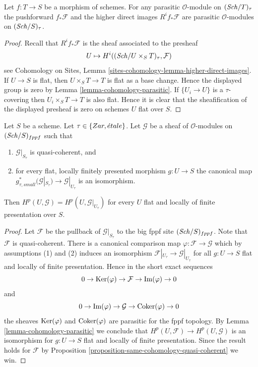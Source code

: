 \begin{lemma}
\label{lemma-direct-image-parasitic}
Let $f : T \to S$ be a morphism of schemes. For any parasitic
$\mathcal{O}$-module on $(\mathit{Sch}/T)_\tau$ the pushforward
$f_*\mathcal{F}$ and the higher direct images $R^if_*\mathcal{F}$
are parasitic $\mathcal{O}$-modules on $(\mathit{Sch}/S)_\tau$.
\end{lemma}

\begin{proof}
Recall that $R^if_*\mathcal{F}$ is the sheaf associated to the
presheaf
$$
U \mapsto H^i((\mathit{Sch}/U \times_S T)_\tau, \mathcal{F})
$$
see
Cohomology on Sites, Lemma \ref{sites-cohomology-lemma-higher-direct-images}.
If $U \to S$ is flat, then $U \times_S T \to T$ is flat as a base change.
Hence the displayed group is zero by
Lemma \ref{lemma-cohomology-parasitic}.
If $\{U_i \to U\}$ is a $\tau$-covering then
$U_i \times_S T \to T$ is also flat.
Hence it is clear that the sheafification of the displayed
presheaf is zero on schemes $U$ flat over $S$.
\end{proof}

\begin{lemma}
\label{lemma-quasi-coherent-and-flat-base-change}
Let $S$ be a scheme. Let $\tau \in \{Zar, {\acute{e}tale}\}$.
Let $\mathcal{G}$ be a sheaf of $\mathcal{O}$-modules on
$(\mathit{Sch}/S)_{fppf}$ such that
\begin{enumerate}
\item $\mathcal{G}|_{S_\tau}$ is quasi-coherent, and
\item for every flat, locally finitely presented morphism
$g : U \to S$ the canonical map
$g_{\tau, small}^*(\mathcal{G}|_{S_\tau}) \to \mathcal{G}|_{U_\tau}$
is an isomorphism.
\end{enumerate}
Then $H^p(U, \mathcal{G}) = H^p(U, \mathcal{G}|_{U_\tau})$
for every $U$ flat and locally of finite presentation over $S$.
\end{lemma}

\begin{proof}
Let $\mathcal{F}$ be the pullback of $\mathcal{G}|_{S_\tau}$
to the big fppf site $(\mathit{Sch}/S)_{fppf}$. Note that $\mathcal{F}$
is quasi-coherent. There is a canonical
comparison map $\varphi : \mathcal{F} \to \mathcal{G}$ which by
assumptions (1) and (2) induces an isomorphism
$\mathcal{F}|_{U_\tau} \to \mathcal{G}|_{U_\tau}$
for all $g : U \to S$ flat and locally of finite presentation.
Hence in the short exact sequences
$$
0 \to \mathop{\mathrm{Ker}}(\varphi) \to \mathcal{F} \to \mathop{\mathrm{Im}}(\varphi) \to 0
$$
and
$$
0 \to \mathop{\mathrm{Im}}(\varphi) \to \mathcal{G} \to \mathop{\mathrm{Coker}}(\varphi) \to 0
$$
the sheaves $\mathop{\mathrm{Ker}}(\varphi)$ and $\mathop{\mathrm{Coker}}(\varphi)$ are
parasitic for the fppf topology. By
Lemma \ref{lemma-cohomology-parasitic}
we conclude that $H^p(U, \mathcal{F}) \to H^p(U, \mathcal{G})$
is an isomorphism for $g : U \to S$ flat and locally of finite presentation.
Since the result holds for $\mathcal{F}$ by
Proposition \ref{proposition-same-cohomology-quasi-coherent}
we win.
\end{proof}













